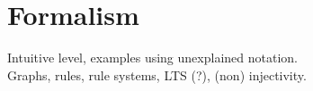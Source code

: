 \section{Formalism}

Intuitive level, examples using unexplained notation.\\
Graphs, rules, rule systems, LTS (?), (non) injectivity.